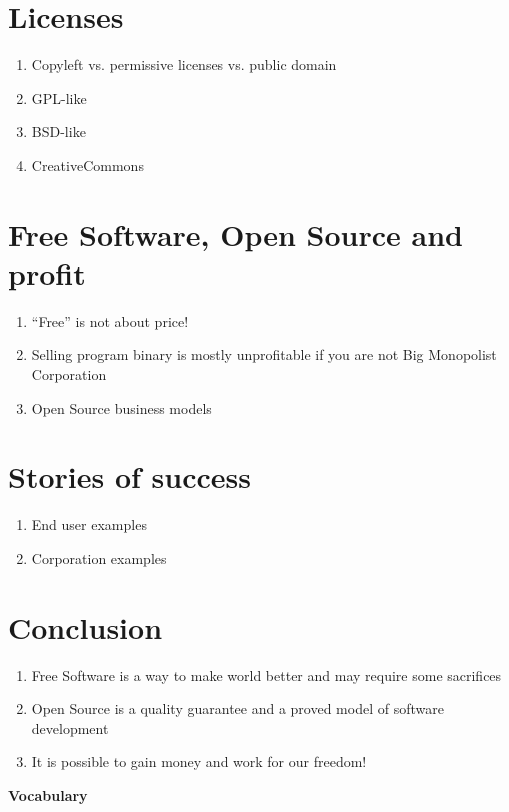 \documentclass[10pt,a4paper]{article}
\newcommand{\bee}{\begin{enumerate}\setlength{\itemsep}{-0.65mm}}
\newcommand{\ene}{\end{enumerate}}
\begin{document}
\begin{multicols}{2}
\section{Licenses}
\bee
  \item Copyleft vs. permissive licenses vs. public domain
  \item GPL-like
  \item BSD-like
  \item CreativeCommons
\ene

\section{Free Software, Open Source and profit}
\bee
  \item ``Free'' is not about price!
  \item Selling program binary is mostly unprofitable if you are not Big Monopolist Corporation
  \item Open Source business models
\ene

\section{Stories of success}
\bee
  \item End user examples
  \item Corporation examples
\ene

\section*{Conclusion}
\bee
  \item Free Software is a way to make world better and may require some sacrifices
  \item Open Source is a quality guarantee and a proved model of software development
  \item It is possible to gain money and work for our freedom!
\ene

\end{multicols}

\begin{center}
{\Large \bfseries Vocabulary}
\end{center}
\end{document}
